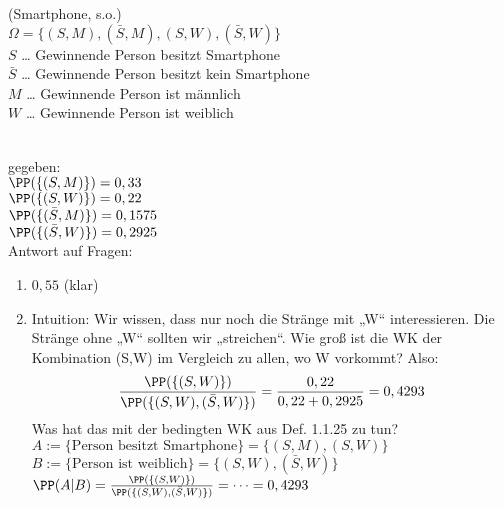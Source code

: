 \documentclass{scrreprt}
\renewenvironment{anumerate}{\begin{enumerate}[label=(\alph*)]}{\end{enumerate}} %
\begin{document}
 (Smartphone, s.o.)\\
$\Omega = \{ (S,M), (\bar S, M), (S, W), (\bar S, W)\}$\\
$S$ … Gewinnende Person besitzt Smartphone\\
$\bar S$ … Gewinnende Person besitzt kein Smartphone\\
$M$ … Gewinnende Person ist männlich\\
$W$ … Gewinnende Person ist weiblich\\
\\
gegeben: \\
$\PP(\{(S,M)\})=0,33$\\
$\PP(\{(S,W)\})=0,22$\\
$\PP(\{ (\bar S, M )\})=0,1575$\\
$\PP(\{ (\bar S, W )\})=0,2925$\\
Antwort auf Fragen:
\begin{anumerate}
\item $0,55$ (klar)
\item Intuition: Wir wissen, dass nur noch die Stränge mit „W“ interessieren. Die Stränge ohne „W“ sollten wir „streichen“. Wie groß ist die WK der Kombination (S,W) im Vergleich zu allen, wo W vorkommt? Also:$$\frac{\PP(\{(S,W)\})}{\PP(\{(S,W),(\bar S,W)\})}=\frac{0,22}{0,22+0,2925}=0,4293$$
Was hat das mit der bedingten WK aus Def. 1.1.25 zu tun? \\
$A:=\{\text{Person besitzt Smartphone}\}=\{(S,M),(S,W)\}$\\
$B:=\{\text{Person ist weiblich}\} = \{(S,W), (\bar S ,W)\}$ \\
$\PP(A|B)=\frac{\PP(\{(S,W)\})}{\PP(\{(S,W), (\bar S, W)\})}=\dots =0,4293$
\end{anumerate}
\end{document}
